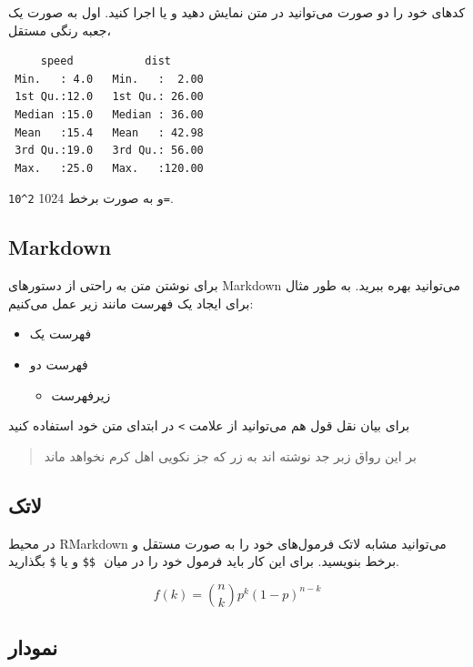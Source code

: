 \documentclass[
]{article}
\providecommand{\tightlist}{%
  \setlength{\itemsep}{0pt}\setlength{\parskip}{0pt}}
\begin{document}
کدهای خود را دو صورت می‌توانید در متن نمایش دهید و یا اجرا کنید. اول به
صورت یک جعبه رنگی مستقل،

\begin{verbatim}
     speed           dist       
 Min.   : 4.0   Min.   :  2.00  
 1st Qu.:12.0   1st Qu.: 26.00  
 Median :15.0   Median : 36.00  
 Mean   :15.4   Mean   : 42.98  
 3rd Qu.:19.0   3rd Qu.: 56.00  
 Max.   :25.0   Max.   :120.00  
\end{verbatim}

و به صورت برخط 1024 \texttt{2\^{}10=}.

\hypertarget{markdown}{%
\subsection{Markdown}\label{markdown}}

برای نوشتن متن به راحتی از دستورهای Markdown می‌توانید بهره ببرید. به
طور مثال برای ایجاد یک فهرست مانند زیر عمل می‌کنیم:

\begin{itemize}
\tightlist
\item
  فهرست یک
\item
  فهرست دو

  \begin{itemize}
  \tightlist
  \item
    زیرفهرست
  \end{itemize}
\end{itemize}

برای بیان نقل قول هم می‌توانید از علامت \texttt{\textgreater{}} در
ابتدای متن خود استفاده کنید

\begin{quote}
بر این رواق زبر جد نوشته اند به زر که جز نکویی اهل کرم نخواهد ماند
\end{quote}

\hypertarget{ux644ux627ux62aux6a9}{%
\subsection{لاتک}\label{ux644ux627ux62aux6a9}}

در محیط RMarkdown می‌توانید مشابه لاتک فرمول‌های خود را به صورت مستقل و
برخط بنویسید. برای این‌ کار باید فرمول خود را در میان ‍‍ ‍‍\texttt{\$\$}
و یا \texttt{\$} بگذارید.

\[f\left(k\right)=\binom{n}{k}p^k\left(1-p\right)^{n-k}\]

\hypertarget{ux646ux645ux648ux62fux627ux631}{%
\subsection{نمودار}\label{ux646ux645ux648ux62fux627ux631}}
\end{document}
